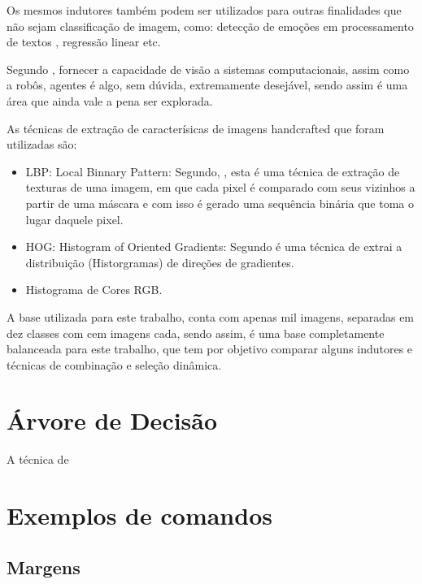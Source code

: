 \documentclass[
article,			%
11pt,				%
oneside,			%
a4paper,			%
english,			%
brazil,				%
sumario=tradicional,
]{abntex2}
\begin{document}
	Os mesmos indutores também podem ser utilizados para outras finalidades que não sejam classificação de imagem, como: detecção de emoções em processamento de textos , regressão linear etc.
	
	Segundo , fornecer a capacidade de visão a sistemas computacionais, assim como a robôs, agentes é algo, sem dúvida, extremamente desejável, sendo assim é uma área que ainda vale a pena ser explorada.
	
	As técnicas de extração de caracterísicas de imagens handcrafted que foram utilizadas são: 
	
	\begin{itemize}
		\item LBP: Local Binnary Pattern: Segundo, , esta é uma técnica de extração de texturas de uma imagem, em que cada pixel é comparado com seus vizinhos a partir de uma máscara e com isso é gerado uma sequência binária que toma o lugar daquele pixel. 
		\item HOG: Histogram of Oriented Gradients: Segundo  é uma técnica de extrai a distribuição (Historgramas) de direções de gradientes.
		\item Histograma de Cores RGB.
	\end{itemize}

	A base utilizada para este trabalho, conta com apenas mil imagens, separadas em dez classes com cem imagens cada, sendo assim, é uma base completamente balanceada para este trabalho, que tem por objetivo comparar alguns indutores e técnicas de combinação e seleção dinâmica.
	
	
	
	\section{Árvore de Decisão}
	
	A técnica de
	
	\section{Exemplos de comandos}
	
	\subsection{Margens}
	
\end{document}
